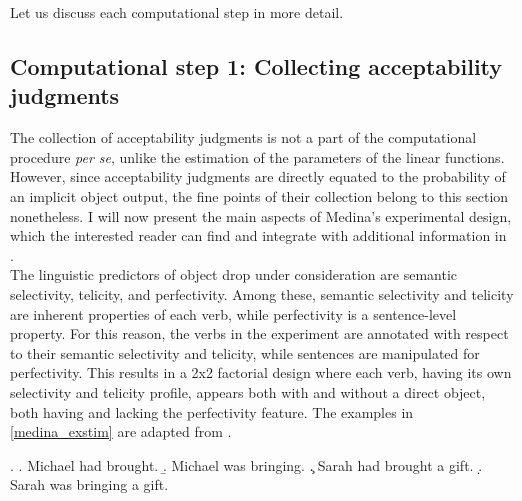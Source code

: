 Let us discuss each computational step in more detail.

\subsection{Computational step 1: Collecting acceptability judgments} The collection of acceptability judgments is not a part of the computational procedure \textit{per se}, unlike the estimation of the parameters of the linear functions. However, since acceptability judgments are directly equated to the probability of an implicit object output, the fine points of their collection belong to this section nonetheless. I will now present the main aspects of Medina's experimental design, which the interested reader can find and integrate with additional information in \textcite[110-134]{Medina2007}.\\
The linguistic predictors of object drop under consideration are semantic selectivity, telicity, and perfectivity. Among these, semantic selectivity and telicity are inherent properties of each verb, while perfectivity is a sentence-level property. For this reason, the verbs in the experiment are annotated with respect to their semantic selectivity and telicity, while sentences are manipulated for perfectivity. This results in a 2x2 factorial design where each verb, having its own selectivity and telicity profile, appears both with and without a direct object, both having and lacking the perfectivity feature. The examples in \ref{medina_exstim} are adapted from \textcite[113]{Medina2007}.

\ex. \label{medina_exstim} \a. \label{medina_exstim1} Michael had brought.
\b. \label{medina_exstim2}  Michael was bringing.
\c. \label{medina_exstim3}  Sarah had brought a gift.
\d. \label{medina_exstim4}  Sarah was bringing a gift.

